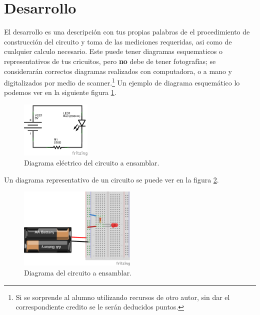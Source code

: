 
\section{Desarrollo}

    El desarrollo es una descripción con tus propias palabras de el procedimiento de construcción del circuito y toma de las mediciones requeridas, asi como de cualquier calculo necesario. Este puede tener diagramas esquematicos o representativos de tus cricuitos, pero \textbf{no} debe de tener fotografías; se considerarán correctos diagramas realizados con computadora, o a mano y digitalizados por medio de scanner.\footnote{Si se sorprende al alumno utilizando recursos de otro autor, sin dar el correspondiente credito se le serán deducidos puntos.} Un ejemplo de diagrama esquemático lo podemos ver en la siguiente figura \ref{dia:elecir}. \\

    \begin{figure}[h]
    	\begin{center}
    		\includegraphics[width=0.3\textwidth]{images/LED-bateria-diagrama.png}
    		\caption{Diagrama eléctrico del circuito a ensamblar.}
    		\label{dia:elecir}
    	\end{center}
    \end{figure}

    Un diagrama representativo de un circuito se puede ver en la figura \ref{dia:cir}. \\

    \begin{figure}[h]
    	\begin{center}
    		\includegraphics[width=0.5\textwidth]{images/LED-bateria.png}
    		\caption{Diagrama del circuito a ensamblar.}
    		\label{dia:cir}
    	\end{center}
    \end{figure}

